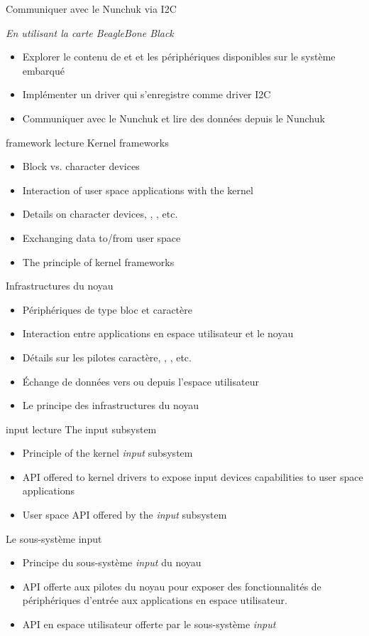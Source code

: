 {Communiquer avec le Nunchuk via I2C}
{
  {\em En utilisant la carte BeagleBone Black}
  \begin{itemize}
  \item Explorer le contenu de  et  et les
    périphériques disponibles sur le système embarqué
  \item Implémenter un driver qui s'enregistre comme driver I2C
  \item Communiquer avec le Nunchuk et lire des données depuis le
    Nunchuk
  \end{itemize}
}
{framework}
{lecture}
{Kernel frameworks}
{
  \begin{itemize}
  \item Block vs. character devices
  \item Interaction of user space applications with the kernel
  \item Details on character devices, , , etc.
  \item Exchanging data to/from user space
  \item The principle of kernel frameworks
  \end{itemize}
}
{Infrastructures du noyau}
{
  \begin{itemize}
  \item Périphériques de type bloc et caractère
  \item Interaction entre applications en espace utilisateur et le noyau
  \item Détails sur les pilotes caractère,  ,
    , etc.
  \item Échange de données vers ou depuis l'espace utilisateur
  \item Le principe des infrastructures du noyau
  \end{itemize}
}
{input}
{lecture}
{The input subsystem}
{
  \begin{itemize}
  \item Principle of the kernel {\em input} subsystem
  \item API offered to kernel drivers to expose input devices
    capabilities to user space applications
  \item User space API offered by the {\em input} subsystem
  \end{itemize}
}
{Le sous-système input}
{
  \begin{itemize}
  \item Principe du sous-système {\em input} du noyau
  \item API offerte aux pilotes du noyau pour exposer
    des fonctionnalités de périphériques d'entrée aux
    applications en espace utilisateur.
  \item API en espace utilisateur offerte par le
    sous-système {\em input}
  \end{itemize}
}
